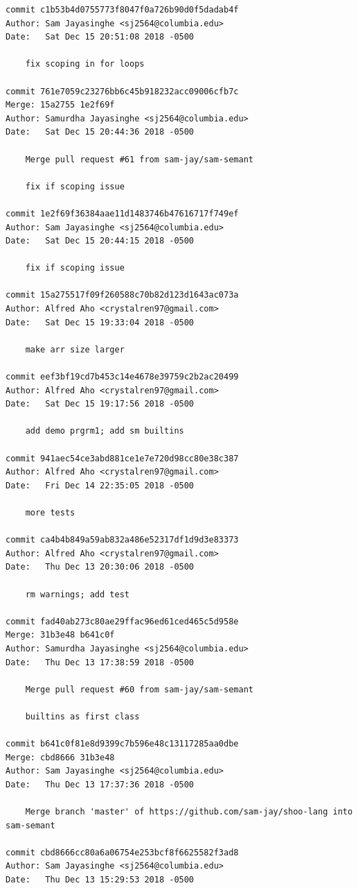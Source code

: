 \documentclass[12pt]{article}
\begin{document}
\begin{lstlisting}
commit c1b53b4d0755773f8047f0a726b90d0f5dadab4f
Author: Sam Jayasinghe <sj2564@columbia.edu>
Date:   Sat Dec 15 20:51:08 2018 -0500

    fix scoping in for loops

commit 761e7059c23276bb6c45b918232acc09006cfb7c
Merge: 15a2755 1e2f69f
Author: Samurdha Jayasinghe <sj2564@columbia.edu>
Date:   Sat Dec 15 20:44:36 2018 -0500

    Merge pull request #61 from sam-jay/sam-semant
    
    fix if scoping issue

commit 1e2f69f36384aae11d1483746b47616717f749ef
Author: Sam Jayasinghe <sj2564@columbia.edu>
Date:   Sat Dec 15 20:44:15 2018 -0500

    fix if scoping issue

commit 15a275517f09f260588c70b82d123d1643ac073a
Author: Alfred Aho <crystalren97@gmail.com>
Date:   Sat Dec 15 19:33:04 2018 -0500

    make arr size larger

commit eef3bf19cd7b453c14e4678e39759c2b2ac20499
Author: Alfred Aho <crystalren97@gmail.com>
Date:   Sat Dec 15 19:17:56 2018 -0500

    add demo prgrm1; add sm builtins

commit 941aec54ce3abd881ce1e7e720d98cc80e38c387
Author: Alfred Aho <crystalren97@gmail.com>
Date:   Fri Dec 14 22:35:05 2018 -0500

    more tests

commit ca4b4b849a59ab832a486e52317df1d9d3e83373
Author: Alfred Aho <crystalren97@gmail.com>
Date:   Thu Dec 13 20:30:06 2018 -0500

    rm warnings; add test

commit fad40ab273c80ae29ffac96ed61ced465c5d958e
Merge: 31b3e48 b641c0f
Author: Samurdha Jayasinghe <sj2564@columbia.edu>
Date:   Thu Dec 13 17:38:59 2018 -0500

    Merge pull request #60 from sam-jay/sam-semant
    
    builtins as first class

commit b641c0f81e8d9399c7b596e48c13117285aa0dbe
Merge: cbd8666 31b3e48
Author: Sam Jayasinghe <sj2564@columbia.edu>
Date:   Thu Dec 13 17:37:36 2018 -0500

    Merge branch 'master' of https://github.com/sam-jay/shoo-lang into sam-semant

commit cbd8666cc80a6a06754e253bcf8f6625582f3ad8
Author: Sam Jayasinghe <sj2564@columbia.edu>
Date:   Thu Dec 13 15:29:53 2018 -0500


\end{lstlisting}
\end{document}
